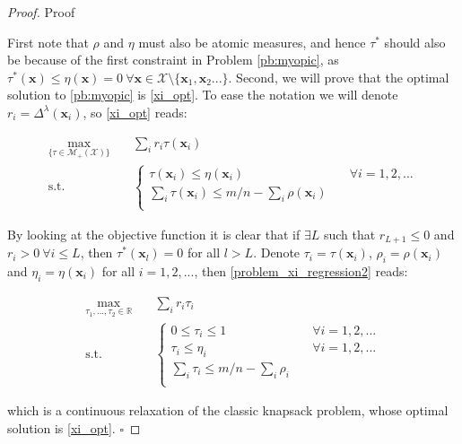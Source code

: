 \documentclass[12pt,a4paper]{article}
\newcommand{\bx}{\mathbf{x}}
\newcommand{\mX}{\mathcal{X}}
\newcommand{\mMplusX}{\mathcal{M}_{+}(\mathcal{X})}
\begin{document}
		\begin{proof}{Proof \\}
			
			First note that $\rho$ and $\eta$ must also be atomic measures, and hence $\tau^*$ should also be because of the first constraint in Problem \eqref{pb:myopic}, as $\tau^*(\bx)\leq \eta(\bx)=0 \ \forall \bx \in \mX\setminus \{\bx_1,\bx_2...\}$. Second, we will prove that the optimal solution to \eqref{pb:myopic} is \eqref{xi_opt}. To ease the notation we will denote $r_i=\Delta^\lambda(\bx_i)$, so \eqref{xi_opt} reads:
			
			\begin{align}
				\max_{\{\tau \in \mMplusX  \}} & \quad  \sum_i r_i \tau(\bx_i) \label{problem_xi_regression2} \\ \nonumber
				\mbox{s.t.} & \quad \left\{ \begin{array}{ll}
					\tau(\bx_i) \leq \eta(\bx_i) & \quad \forall i=1,2,... \\
					\sum_i \tau(\bx_i)\leq m/n - \sum_i \rho(\bx_i)&\\
				\end{array} \right.
			\end{align}
			
			By looking at the objective function it is clear that if $\exists L$ such that $r_{L+1}\leq 0$ and $r_{i}>0 \ \forall i\leq L$, then $\tau^*(\bx_l)=0$ for all $l> L$. Denote $\tau_i=\tau(\bx_i)$, $\rho_i=\rho(\bx_i)$ and $\eta_i=\eta(\bx_i)$ for all $i=1,2,...$, then \eqref{problem_xi_regression2} reads:
			
			\begin{align}
				\max_{\tau_1,...,\tau_2 \in \mathbb{R}} & \quad  \sum_i r_i \tau_i \label{knapsack} \\ \nonumber
				\mbox{s.t.} & \quad \left\{ \begin{array}{ll}
					0 \leq \tau_i \leq 1 & \quad \forall i=1,2,... \\
					\tau_i  \leq \eta_i &  \quad \forall i=1,2,... \\
					\sum_i \tau_i \leq m/n -\sum_i \rho_i&\\
				\end{array} \right.
			\end{align}
			
			\noindent which is a continuous relaxation of the classic knapsack problem, whose optimal solution is \eqref{xi_opt}. \hfill $\square$
			
		\end{proof}
		
\end{document}
